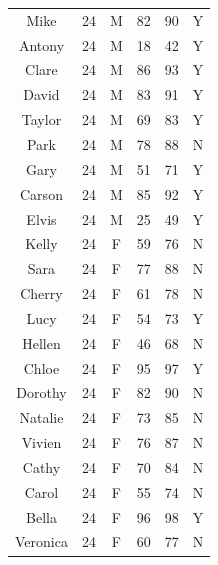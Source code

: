 \documentclass[a4paper, 12pt,twoside]{book}
\newenvironment{knitrout}{}{} %
\begin{document}
\begin{center}
\begin{knitrout}
\begin{table}[!h]
{\begin{tabular}[t]{cccccc}
Mike & 24 & M & 82 & 90 & Y\\
Antony & 24 & M & 18 & 42 & Y\\
Clare & 24 & M & 86 & 93 & Y\\
David & 24 & M & 83 & 91 & Y\\
Taylor & 24 & M & 69 & 83 & Y\\
Park & 24 & M & 78 & 88 & N\\
Gary & 24 & M & 51 & 71 & Y\\
Carson & 24 & M & 85 & 92 & Y\\
Elvis & 24 & M & 25 & 49 & Y\\
Kelly & 24 & F & 59 & 76 & N\\
Sara & 24 & F & 77 & 88 & N\\
Cherry & 24 & F & 61 & 78 & N\\
Lucy & 24 & F & 54 & 73 & Y\\
Hellen & 24 & F & 46 & 68 & N\\
Chloe & 24 & F & 95 & 97 & Y\\
Dorothy & 24 & F & 82 & 90 & N\\
Natalie & 24 & F & 73 & 85 & N\\
Vivien & 24 & F & 76 & 87 & N\\
Cathy & 24 & F & 70 & 84 & N\\
Carol & 24 & F & 55 & 74 & N\\
Bella & 24 & F & 96 & 98 & Y\\
Veronica & 24 & F & 60 & 77 & N\\
\bottomrule
\end{tabular}
}
\end{table}

\end{knitrout}
\end{center}
\end{document}
